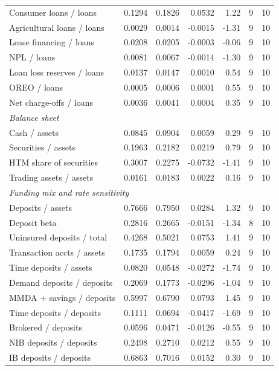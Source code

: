 \begin{tabular}{lrrrrrr}
Consumer loans / loans & 0.1294 & 0.1826 & 0.0532 & 1.22 & 9 & 10 \\
Agricultural loans / loans & 0.0029 & 0.0014 & -0.0015 & -1.31 & 9 & 10 \\
Lease financing / loans & 0.0208 & 0.0205 & -0.0003 & -0.06 & 9 & 10 \\
NPL / loans & 0.0081 & 0.0067 & -0.0014 & -1.30 & 9 & 10 \\
Loan loss reserves / loans & 0.0137 & 0.0147 & 0.0010 & 0.54 & 9 & 10 \\
OREO / loans & 0.0005 & 0.0006 & 0.0001 & 0.55 & 9 & 10 \\
Net charge-offs / loans & 0.0036 & 0.0041 & 0.0004 & 0.35 & 9 & 10 \\
\midrule
\multicolumn{7}{l}{\emph{Balance sheet}} \\
\midrule
Cash / assets & 0.0845 & 0.0904 & 0.0059 & 0.29 & 9 & 10 \\
Securities / assets & 0.1963 & 0.2182 & 0.0219 & 0.79 & 9 & 10 \\
HTM share of securities & 0.3007 & 0.2275 & -0.0732 & -1.41 & 9 & 10 \\
Trading assets / assets & 0.0161 & 0.0183 & 0.0022 & 0.16 & 9 & 10 \\
\midrule
\multicolumn{7}{l}{\emph{Funding mix and rate sensitivity}} \\
\midrule
Deposits / assets & 0.7666 & 0.7950 & 0.0284 & 1.32 & 9 & 10 \\
Deposit beta & 0.2816 & 0.2665 & -0.0151 & -1.34 & 8 & 10 \\
Uninsured deposits / total & 0.4268 & 0.5021 & 0.0753 & 1.41 & 9 & 10 \\
Transaction accts / assets & 0.1735 & 0.1794 & 0.0059 & 0.24 & 9 & 10 \\
Time deposits / assets & 0.0820 & 0.0548 & -0.0272 & -1.74 & 9 & 10 \\
Demand deposits / deposits & 0.2069 & 0.1773 & -0.0296 & -1.04 & 9 & 10 \\
MMDA + savings / deposits & 0.5997 & 0.6790 & 0.0793 & 1.45 & 9 & 10 \\
Time deposits / deposits & 0.1111 & 0.0694 & -0.0417 & -1.69 & 9 & 10 \\
Brokered / deposits & 0.0596 & 0.0471 & -0.0126 & -0.55 & 9 & 10 \\
NIB deposits / deposits & 0.2498 & 0.2710 & 0.0212 & 0.55 & 9 & 10 \\
IB deposits / deposits & 0.6863 & 0.7016 & 0.0152 & 0.30 & 9 & 10 \\

\end{tabular}

